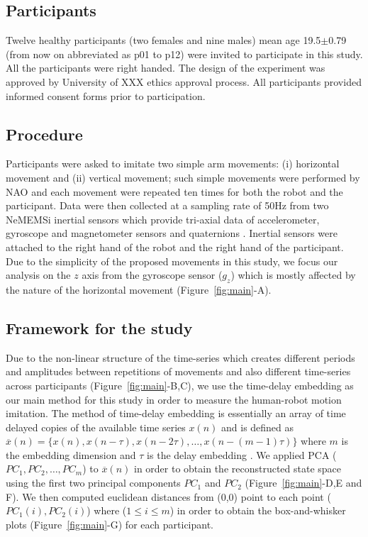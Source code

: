 \documentclass{sig-alternate-05-2015}
\begin{document}



\subsection{Participants}
Twelve healthy participants (two females and nine males)
mean age 19.5$\pm$0.79 (from now on abbreviated as p01 to p12) were invited to 
participate in this study. All the participants were right handed.
The design of the experiment was approved by University of XXX ethics approval
process. All participants provided informed consent forms prior to participation.



\subsection{Procedure}
Participants were asked to imitate two simple arm movements: (i) 
horizontal movement and (ii) vertical movement;
such simple movements were performed by NAO and each movement were repeated ten times
for both the robot and the participant.
Data were then collected at a sampling rate of 50Hz from two NeMEMSi inertial sensors
which provide tri-axial data of accelerometer, gyroscope and magnetometer sensors and
quaternions \cite{Comotti2014}. Inertial sensors were attached to the right 
hand of the robot and the right hand of the participant.
Due to the simplicity of the proposed movements  in this study, 
we focus our analysis on the $z$ axis from the gyroscope sensor ($g_z$) 
which is mostly affected by the nature of the horizontal movement 
(Figure~\ref{fig:main}-A).

\subsection{Framework for the study}

Due to the non-linear structure of the time-series 
which creates different periods and amplitudes 
between repetitions of movements and also different time-series across participants
(Figure~\ref{fig:main}-B,C), we use the time-delay embedding
as our main method for this study in order to measure the human-robot motion imitation.
The method of time-delay embedding is essentially an array of 
time delayed copies of the available time series $x(n)$ and is defined as  
$ \overline{x}(n) = \{  x(n), x(n-\tau), x(n-2\tau), \dots,x(n-(m-1)\tau)\}$
where $m$ is the embedding dimension and $\tau$ is the delay embedding \cite{Huke2006}.
We applied PCA ($PC_1, PC_2, \dots, PC_m$) to $ \overline{x}(n)$
in order to obtain the reconstructed state space 
using the first two principal components $PC_1$ and $PC_2$ (Figure~\ref{fig:main}-D,E and F).
We then computed euclidean distances from (0,0) point to each 
point ($PC_1(i),PC_2(i)$) where ($1 \leq i \leq m$)
in order to obtain the box-and-whisker plots (Figure~\ref{fig:main}-G)
for each participant.
\end{document}
